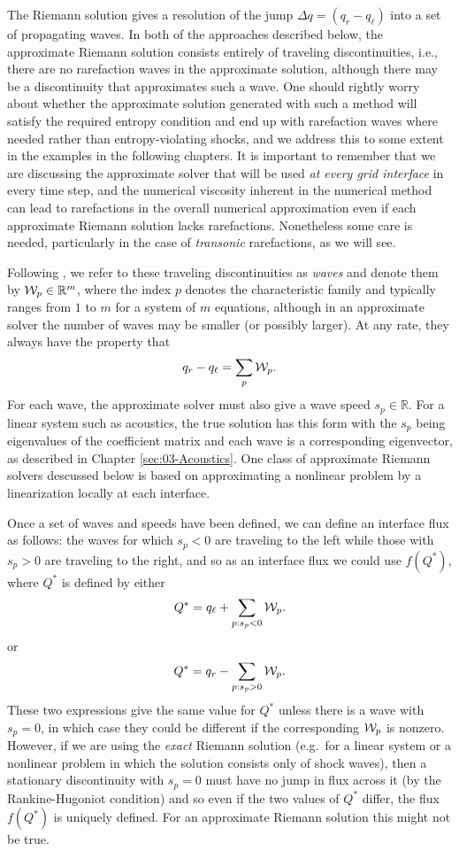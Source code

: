 \documentclass{SIAMbook2016}
\begin{document}
The Riemann solution gives a resolution of the jump
\(\Delta q = (q_r - q_\ell)\) into a set of propagating waves. In both
of the approaches described below, the approximate Riemann solution
consists entirely of traveling discontinuities, i.e., there are no
rarefaction waves in the approximate solution, although there may be a
discontinuity that approximates such a wave. One should rightly worry
about whether the approximate solution generated with such a method will
satisfy the required entropy condition and end up with rarefaction waves
where needed rather than entropy-violating shocks, and we address this
to some extent in the examples in the following chapters. It is
important to remember that we are discussing the approximate solver that
will be used \emph{at every grid interface} in every time step, and the
numerical viscosity inherent in the numerical method can lead to
rarefactions in the overall numerical approximation even if each
approximate Riemann solution lacks rarefactions. Nonetheless some care
is needed, particularly in the case of \emph{transonic} rarefactions, as
we will see.

Following \cite{fvmhp}, we refer to these traveling discontinuities as
\emph{waves} and denote them by \({\cal W}_p \in {\mathbb R}^m\), where
the index \(p\) denotes the characteristic family and typically ranges
from \(1\) to \(m\) for a system of \(m\) equations, although in an
approximate solver the number of waves may be smaller (or possibly
larger). At any rate, they always have the property that
\begin{align}\label{Wsum}
q_r - q_\ell = \sum_{p} {\cal W}_p.
\end{align} For each wave, the approximate solver must also give a wave
speed \(s_p \in{\mathbb R}\). For a linear system such as acoustics, the
true solution has this form with the \(s_p\) being eigenvalues of the
coefficient matrix and each wave is a corresponding eigenvector, as
described in Chapter \ref{sec:03-Acoustics}. One class of approximate
Riemann solvers descussed below is based on approximating a nonlinear
problem by a linearization locally at each interface.

Once a set of waves and speeds have been defined, we can define an
interface flux as follows: the waves for which \(s_p < 0\) are traveling
to the left while those with \(s_p>0\) are traveling to the right, and
so as an interface flux we could use \(f(Q^*)\), where \(Q^*\) is
defined by either \[
Q^* = q_\ell + \sum_{p: s_p < 0} {\cal W}_p.
\] or \[
Q^* = q_r - \sum_{p: s_p > 0} {\cal W}_p.
\] These two expressions give the same value for \(Q^*\) unless there is
a wave with \(s_p=0\), in which case they could be different if the
corresponding \({\cal W}_p\) is nonzero. However, if we are using the
\emph{exact} Riemann solution (e.g.~for a linear system or a nonlinear
problem in which the solution consists only of shock waves), then a
stationary discontinuity with \(s_p=0\) must have no jump in flux across
it (by the Rankine-Hugoniot condition) and so even if the two values of
\(Q^*\) differ, the flux \(f(Q^*)\) is uniquely defined. For an
approximate Riemann solution this might not be true.
\end{document}
